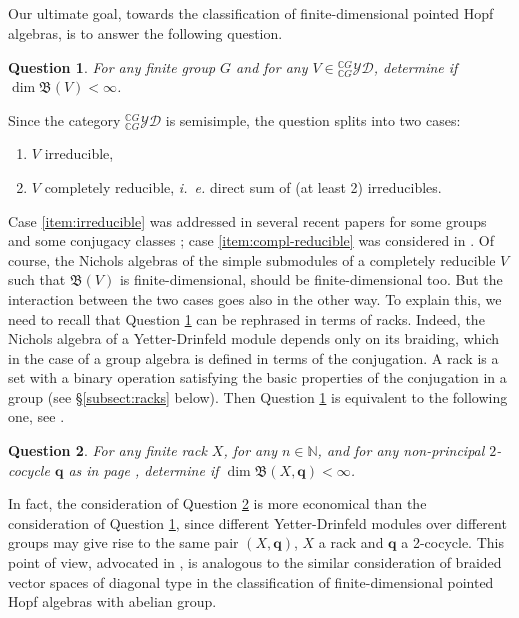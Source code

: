 \documentclass[11pt]{amsart} \textheight 22cm
\renewcommand{\^}[1]{\mbox{$^{\left( #1 \right)}$}}
\renewcommand{\_}[1]{\mbox{$_{\left( #1 \right)}$}}
\newcommand\toba{{\mathfrak B }}
\newcommand{\ku}{\mathbb C}
\newcommand{\N}{{\mathbb N}}
\newcommand{\q}{{\mathbf q}}
\newcommand{\ydg}{{}^{\ku G}_{\ku G}\mathcal{YD}}
\theoremstyle{plain}
\newtheorem{question}{Question}
\theoremstyle{definition}
\theoremstyle{remark}
\theoremstyle{remark}
\begin{document}
\medbreak\subsection{} Our ultimate goal, towards the
classification of finite-dimensional poin\-ted Hopf algebras, is
to answer the following question.

\begin{question}\label{que:groups}
    For any finite group $G$ and for any $V\in \ydg$, determine if $\dim \toba(V) < \infty$.
\end{question}

Since the category $\ydg$ is semisimple, the question splits into
two cases:
\renewcommand{\theenumi}{\roman{enumi}}   \renewcommand{\labelenumi}{(\theenumi)}
\begin{enumerate}
    \item\label{item:irreducible}
        $V$ irreducible,
    \item \label{item:compl-reducible}
       $V$ completely reducible, \emph{i.~e.} direct sum of (at least 2) irreducibles.
\end{enumerate}

Case \eqref{item:irreducible} was addressed in several recent
papers for some groups and some conjugacy classes \cite{AZ, AF1,
AF2, AF3, afz, FGV, FV}; case \eqref{item:compl-reducible} was
considered in \cite{AHS, HS1}. Of course, the Nichols algebras of
the simple submodules of a completely reducible $V$ such that
$\toba(V)$ is finite-dimensional, should be finite-dimensional
too. But the interaction between the two cases goes also in the
other way. To explain this, we need to recall that Question
\ref{que:groups} can be rephrased in terms of racks. Indeed, the
Nichols algebra of a Yetter-Drinfeld module depends only on its
braiding, which in the case of a group algebra is defined in terms
of the conjugation. A rack is a set with a binary operation
satisfying the basic properties of the conjugation in a group (see
\S\ref{subsect:racks} below).  Then Question \ref{que:groups} is
equivalent to the following one, see \cite{AG1}.


\begin{question}\label{que:racks}
    For any finite rack $X$, for any $n\in \N$, and for any non-principal $2$-cocycle $\q$
    as in page \pageref{eqn:non-ppal-cocycle}, determine if $\dim \toba(X, \q) < \infty$.
\end{question}

In fact, the consideration of Question \ref{que:racks} is more
economical than the consideration of Question \ref{que:groups},
since different Yetter-Drinfeld modules over different groups may
give rise to the same pair $(X, \q)$, $X$ a rack and $\q$ a
2-cocycle. This point of view, advocated in \cite{G1, AG1}, is
analogous to the similar consideration of braided vector spaces of
diagonal type in the classification of finite-dimensional pointed
Hopf algebras with abelian group.
\end{document}
